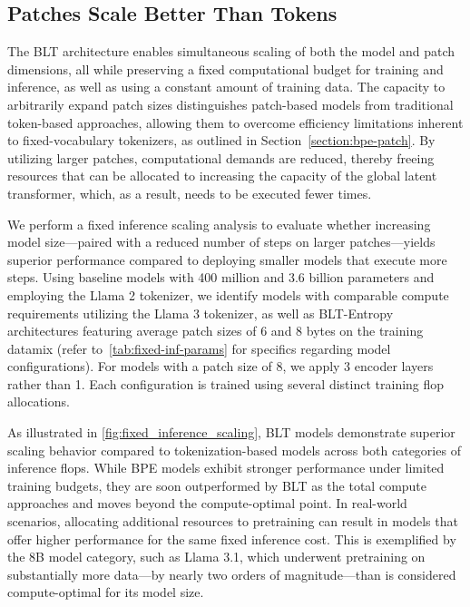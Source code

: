 \subsection{Patches Scale Better Than Tokens} The {\textsc BLT} architecture enables simultaneous scaling of both the model and patch dimensions, all while preserving a fixed computational budget for training and inference, as well as using a constant amount of training data. The capacity to arbitrarily expand patch sizes distinguishes patch-based models from traditional token-based approaches, allowing them to overcome efficiency limitations inherent to fixed-vocabulary tokenizers, as outlined in Section~\ref{section:bpe-patch}. By utilizing larger patches, computational demands are reduced, thereby freeing resources that can be allocated to increasing the capacity of the global latent transformer, which, as a result, needs to be executed fewer times.

We perform a fixed inference scaling analysis to evaluate whether increasing model size—paired with a reduced number of steps on larger patches—yields superior performance compared to deploying smaller models that execute more steps. Using baseline models with 400 million and 3.6 billion parameters and employing the Llama 2 tokenizer, we identify models with comparable compute requirements utilizing the Llama 3 tokenizer, as well as {\textsc BLT}-Entropy architectures featuring average patch sizes of 6 and 8 bytes on the training datamix (refer to~\autoref{tab:fixed-inf-params} for specifics regarding model configurations). For models with a patch size of 8, we apply 3 encoder layers rather than 1. Each configuration is trained using several distinct training flop allocations.

As illustrated in \autoref{fig:fixed_inference_scaling}, {\textsc BLT} models demonstrate superior scaling behavior compared to tokenization-based models across both categories of inference flops. While BPE models exhibit stronger performance under limited training budgets, they are soon outperformed by {\textsc BLT} as the total compute approaches and moves beyond the compute-optimal point. In real-world scenarios, allocating additional resources to pretraining can result in models that offer higher performance for the same fixed inference cost. This is exemplified by the 8B model category, such as Llama 3.1, which underwent pretraining on substantially more data—by nearly two orders of magnitude—than is considered compute-optimal for its model size.

